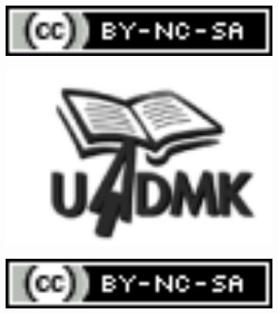 \documentclass[12pt]{article}
\begin{document}
\begin{figure}[ht]
\centering
\includegraphics[width=0.9\textwidth]{PS4_page_3_img_1.png}
\end{figure}

\clearpage
\begin{figure}[ht]
\centering
\includegraphics[width=0.9\textwidth]{PS4_page_4_img_0.png}
\end{figure}

\begin{figure}[ht]
\centering
\includegraphics[width=0.9\textwidth]{PS4_page_4_img_1.png}
\end{figure}

\clearpage
\end{document}
